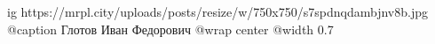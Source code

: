  
 
 
 
 

\ifcmt
  ig https://mrpl.city/uploads/posts/resize/w/750x750/s7spdnqdambjnv8b.jpg
  @caption Глотов Иван Федорович
  @wrap center
  @width 0.7
\fi
